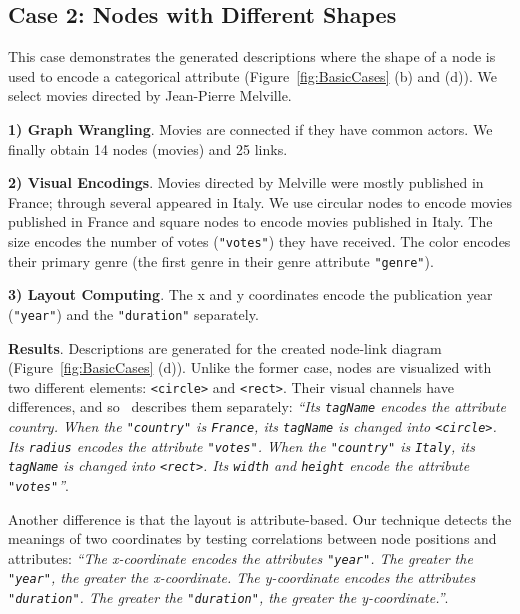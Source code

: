 \subsection{Case 2: Nodes with Different Shapes}
This case demonstrates the generated descriptions where the shape of a node is used to encode a categorical attribute (Figure~\ref{fig:BasicCases} (b) and (d)).
We select movies directed by Jean-Pierre Melville. 

\noindent \textbf{1) Graph Wrangling}. 
Movies are connected if they have common actors. 
We finally obtain 14 nodes (movies) and 25 links.

\noindent \textbf{2) Visual Encodings}.
Movies directed by Melville were mostly published in France; through several appeared in Italy.
We use circular nodes to encode movies published in France and square nodes to encode movies published in Italy.
The size encodes the number of votes (\texttt{"votes"}) they have received.
The color encodes their primary genre (the first genre in their genre attribute \texttt{"genre"}).

\noindent \textbf{3) Layout Computing}.
The x and y coordinates encode the publication year (\texttt{"year"}) and the \texttt{"duration"} separately.

\textbf{Results}.
Descriptions are generated for the created node-link diagram (Figure~\ref{fig:BasicCases} (d)).
Unlike the former case, nodes are visualized with two different elements: \texttt{<circle>} and \texttt{<rect>}.
Their visual channels have differences, and so \ApproachName~describes them separately:
\textit{``Its \texttt{tagName} encodes the attribute country.
When the \texttt{"country"} is \texttt{France}, its \texttt{tagName} is changed into \texttt{<circle>}.
Its \texttt{radius} encodes the attribute \texttt{"votes"}.
When the \texttt{"country"} is \texttt{Italy}, its \texttt{tagName} is changed into \texttt{<rect>}.
Its \texttt{width} and \texttt{height} encode the attribute \texttt{"votes"}''}.

Another difference is that the layout is attribute-based.
Our technique detects the meanings of two coordinates by testing correlations between node positions and attributes: 
\textit{``The x-coordinate encodes the attributes \texttt{"year"}. 
The greater the \texttt{"year"}, the greater the x-coordinate.
The y-coordinate encodes the attributes \texttt{"duration"}.
The greater the \texttt{"duration"}, the greater the y-coordinate.''}.



